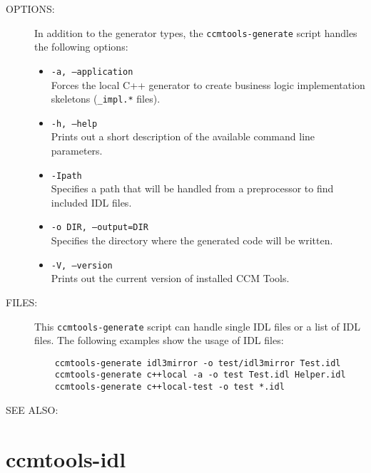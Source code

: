 \begin{description}
\item [OPTIONS:]
  In addition to the generator types, the {\tt ccmtools-generate} script handles
  the following options:
  \begin{itemize}
  \item {\tt -a, --application} \\
    Forces the local C++ generator to create business logic
    implementation skeletons ({\tt *\_impl.*} files).

  \item {\tt -h, --help} \\
    Prints out a short description of the available command line parameters.

  \item {\tt -Ipath} \\
    Specifies a path that will be handled from a preprocessor to find 
    included IDL files.

  \item {\tt -o DIR, --output=DIR} \\
    Specifies the directory where the generated code will be written. 

  \item {\tt -V, --version} \\
    Prints out the current version of installed CCM Tools.
  \end{itemize}
  
\item [FILES:]
  This {\tt ccmtools-generate} script can handle single IDL files or a list of IDL
  files. The following examples show the usage of IDL files: 
  \begin{verbatim}
    ccmtools-generate idl3mirror -o test/idl3mirror Test.idl
    ccmtools-generate c++local -a -o test Test.idl Helper.idl 
    ccmtools-generate c++local-test -o test *.idl
  \end{verbatim}
\item [SEE ALSO:]
\end{description}


\section{ccmtools-idl}

